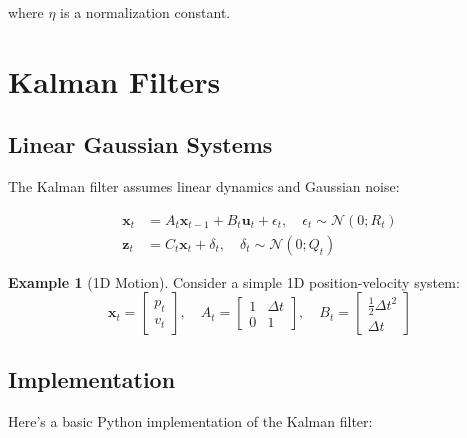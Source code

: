 \documentclass[14pt,letterpaper]{article}
\theoremstyle{definition}
\newtheorem{example}{Example}[section]
\newcommand{\normal}[2]{\mathcal{N}\left(#1; #2\right)}
\newcommand{\state}{\bm{x}}
\newcommand{\obs}{\bm{z}}
\newcommand{\control}{\bm{u}}
\begin{document}
where $\eta$ is a normalization constant.

\section{Kalman Filters}

\subsection{Linear Gaussian Systems}

The Kalman filter assumes linear dynamics and Gaussian noise:

\begin{align}
    \state_t &= A_t \state_{t-1} + B_t \control_t + \epsilon_t, \quad \epsilon_t \sim \normal{0}{R_t} \label{eq:motion_model}\\
    \obs_t &= C_t \state_t + \delta_t, \quad \delta_t \sim \normal{0}{Q_t} \label{eq:measurement_model}
\end{align}

\begin{example}[1D Motion]
Consider a simple 1D position-velocity system:
\[
\state_t = \begin{bmatrix} p_t \\ v_t \end{bmatrix}, \quad
A_t = \begin{bmatrix} 1 & \Delta t \\ 0 & 1 \end{bmatrix}, \quad
B_t = \begin{bmatrix} \frac{1}{2}\Delta t^2 \\ \Delta t \end{bmatrix}
\]
\end{example}

\subsection{Implementation}

Here's a basic Python implementation of the Kalman filter:
\end{document}
